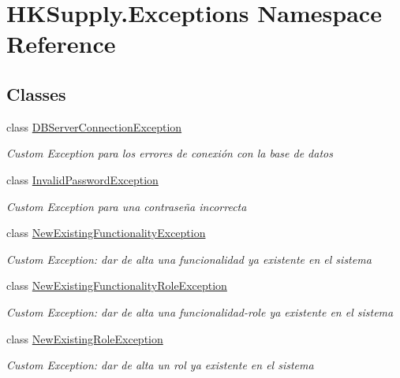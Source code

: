 \hypertarget{namespace_h_k_supply_1_1_exceptions}{}\section{H\+K\+Supply.\+Exceptions Namespace Reference}
\label{namespace_h_k_supply_1_1_exceptions}
\subsection*{Classes}
\begin{DoxyCompactItemize}
\item 
class \hyperlink{class_h_k_supply_1_1_exceptions_1_1_d_b_server_connection_exception}{D\+B\+Server\+Connection\+Exception}
\begin{DoxyCompactList}\small\item\em Custom Exception para los errores de conexión con la base de datos \end{DoxyCompactList}\item 
class \hyperlink{class_h_k_supply_1_1_exceptions_1_1_invalid_password_exception}{Invalid\+Password\+Exception}
\begin{DoxyCompactList}\small\item\em Custom Exception para una contraseña incorrecta \end{DoxyCompactList}\item 
class \hyperlink{class_h_k_supply_1_1_exceptions_1_1_new_existing_functionality_exception}{New\+Existing\+Functionality\+Exception}
\begin{DoxyCompactList}\small\item\em Custom Exception\+: dar de alta una funcionalidad ya existente en el sistema \end{DoxyCompactList}\item 
class \hyperlink{class_h_k_supply_1_1_exceptions_1_1_new_existing_functionality_role_exception}{New\+Existing\+Functionality\+Role\+Exception}
\begin{DoxyCompactList}\small\item\em Custom Exception\+: dar de alta una funcionalidad-\/role ya existente en el sistema \end{DoxyCompactList}\item 
class \hyperlink{class_h_k_supply_1_1_exceptions_1_1_new_existing_role_exception}{New\+Existing\+Role\+Exception}
\begin{DoxyCompactList}\small\item\em Custom Exception\+: dar de alta un rol ya existente en el sistema \end{DoxyCompactList}\item 

\end{DoxyCompactItemize}
